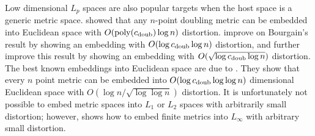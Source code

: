 \documentclass[../main.tex]{subfiles}
\newcommand{\dist}[2]{\distf({#1},{#2})}
\newcommand{\distf}{d}
\newcommand{\doubdim}{\text{dim}_\textnormal{doub}}
\newcommand{\cdoub}{c_\textnormal{doub}}
\newcommand{\poly}[1]{\text{poly}(#1)}
\begin{document}
Low dimensional $L_p$ spaces are also popular targets when the host space is a generic metric space.
\cite{bourgain1985lipschitz} showed that any $n$-point doubling metric can be embedded into Euclidean space with $O(\poly{\cdoub}\log n)$ distortion.
\cite{gupta2003bounded} improve on Bourgain's result by showing an embedding with $O(\log\cdoub\log n)$ distortion,
and \cite{krauthgamer2004measured} further improve this result by showing an embedding with $O(\sqrt{\log\cdoub\log n})$ distortion.
The best known embeddings into Euclidean space are due to \cite{chan2010ultra}.
They show that every $n$ point metric can be embedded into $O(\log\cdoub\log\log n)$ dimensional Euclidean space with $O(\log n/\sqrt{\log\log n})$ distortion.
It is unfortunately not possible to embed metric spaces into $L_1$ or $L_2$ spaces with arbitrarily small distortion;
however, \cite{neiman2016low} shows how to embed finite metrics into $L_\infty$ with arbitrary small distortion.

\end{document}
